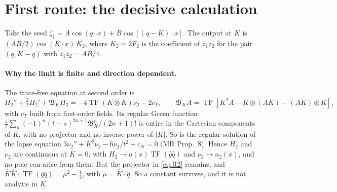 \documentclass[10pt]{article}
\newcommand{\TF}{\operatorname{TF}}
\newcommand{\Kh}{\hat K}
\newcommand{\qh}{\hat q}
\begin{document}
\section{First route: the decisive calculation}

Take the seed $\zeta_1=A\cos(q\cdot x)+B\cos[(q-K)\cdot x]$. The output at $K$ is $(AB/2)\cos(K\cdot x)\,K_2$, where $K_2=2F_2$ is the coefficient of $z_1z_2$ for the pair $(q,K-q)$ with $z_1z_2=AB/4$.

\paragraph{Why the limit is finite and direction dependent.} The trace-free equation at second order is
\[
H_2''+\tfrac2tH_2'+\mathfrak B_KH_2=-4\TF(K\otimes K)\nu_2-2c_T,\qquad \mathfrak B_KA=\TF[K^2A-K\otimes(AK)-(AK)\otimes K],
\]
with $c_T$ built from first-order fields. Its regular Green function $\frac st\sum_{n}(-1)^n(t-s)^{2n+1}\mathfrak B_K^n/(2n+1)!$ is entire in the Cartesian components of $K$, with no projector and no inverse power of $|K|$. So is the regular solution of the lapse equation $3\nu_2''+K^2\nu_2-6\nu_2/t^2+c_N=0$ (MR Prop.~8). Hence $H_2$ and $\nu_2$ are continuous at $K=0$, with $H_2\to a(x)\TF(\qh\qh)$ and $\nu_2\to n_2(x)$, and no pole can arise from them. But the projector in \eqref{eq:R2} remains, and $\Kh\Kh\cdot\TF(\qh\qh)=\mu^2-\frac13$, with $\mu=\Kh\cdot\qh$. So a constant survives, and it is not analytic in $K$.
\end{document}

